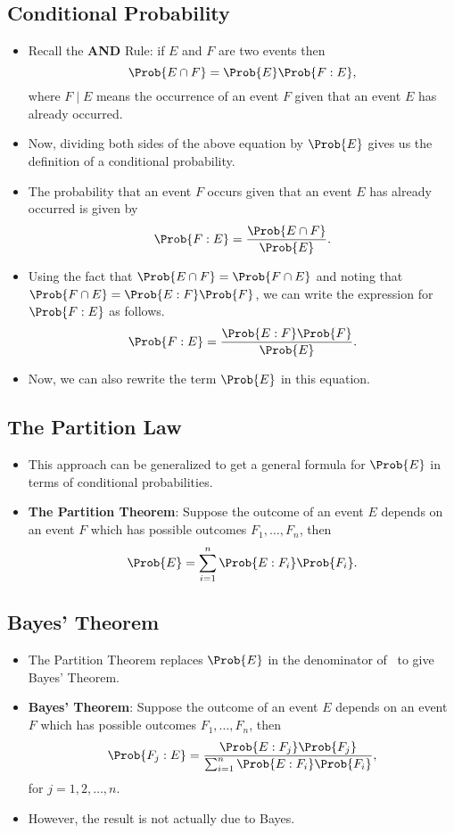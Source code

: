 \subsection*{Conditional Probability}
\begin{itemize}
      \item Recall the \textbf{AND} Rule: if $E$ and $F$ are two events then
            \[ \Prob{E\cap F}=\Prob{E}\Prob{F\given E}, \]
            where $F \mid E$ means the occurrence of an event $F$ given that an event $E$
            has already occurred.
      \item Now, dividing both sides of the above equation by $ \Prob{E} $ gives us the
            definition of a conditional probability.
      \item The probability that an event $F$ occurs given that an event $E$ has
            already occurred is given by
            \[ \Prob{F\given E}=\frac{\Prob{E\cap F}}{\Prob{E}}. \]
      \item Using the fact that $ \Prob{E\cap F}=\Prob{F\cap E} $ and noting that
            $ \Prob{F\cap E}=\Prob{E\given F}\Prob{F} $, we can write the expression for $ \Prob{F\given E} $
            as follows.
            \begin{equation}
                  \Prob{F\given E}=\frac{\Prob{E\given F}\Prob{F}}{\Prob{E}}\label{eqbayes}.
            \end{equation}
      \item Now, we can also rewrite the term $ \Prob{E} $ in this equation.
\end{itemize}
\subsection*{The Partition Law}
\begin{itemize}
      \item This approach can be generalized to get a general formula for $ \Prob{E} $ in
            terms of conditional probabilities.
      \item \textbf{The Partition Theorem}: Suppose the outcome of an event $ E $ depends on an event
            $ F $ which has possible outcomes $ F_1,\ldots,F_n $, then
            \[ \Prob{E}=\sum_{i=1}^{n}\Prob{E\given F_i}\Prob{F_i}. \]
\end{itemize}
\subsection*{Bayes' Theorem}
\begin{itemize}
      \item The Partition Theorem replaces $ \Prob{E} $ in the denominator of~ to give Bayes' Theorem.
      \item \textbf{Bayes' Theorem}: Suppose the outcome of an event $ E $ depends on an event
            $ F $ which has possible outcomes $ F_1,\ldots,F_n $, then
            \[ \Prob{F_j\given E}=\frac{\Prob{E\given F_j}\Prob{F_j}}{\sum_{i=1}^{n}\Prob{E\given F_i}\Prob{F_i}}, \]
            for $ j=1,2,\ldots,n $.
      \item However, the result is not actually due to Bayes.
\end{itemize}
